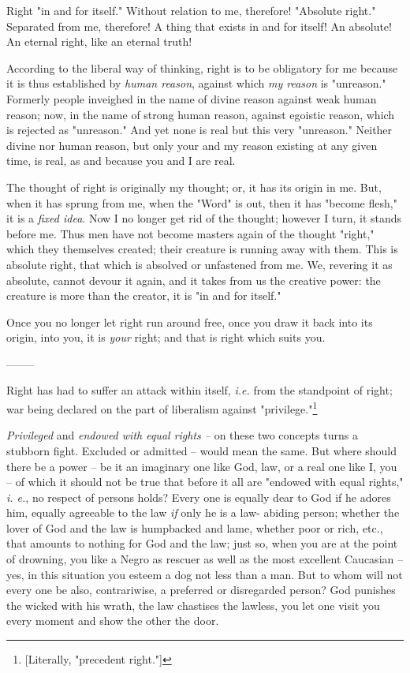 Right "{}in and for itself."{} Without relation to me, therefore! "{}Absolute 
right."{} Separated from me, therefore! A thing that exists in and for itself! 
An absolute! An eternal right, like an eternal truth!

According to the liberal way of thinking, right is to be obligatory for me 
because it is thus established by \textit{human reason}, against which 
\textit{my reason} is "{}unreason."{} Formerly people inveighed in the name of 
divine reason against weak human reason; now, in the name of strong human 
reason, against egoistic reason, which is rejected as "{}unreason."{} And yet 
none is real but this very "{}unreason."{} Neither divine nor human reason, 
but only your and my reason existing at any given time, is real, as and 
because you and I are real.

The thought of right is originally my thought; or, it has its origin in me. 
But, when it has sprung from me, when the "{}Word"{} is out, then it has 
"{}become flesh,"{} it is a \textit{fixed idea}. Now I no longer get rid of 
the thought; however I turn, it stands before me. Thus men have not become 
masters again of the thought "{}right,"{} which they themselves created; their 
creature is running away with them. This is absolute right, that which is 
absolved or unfastened from me. We, revering it as absolute, cannot devour it 
again, and it takes from us the creative power: the creature is more than the 
creator, it is "{}in and for itself."{}

Once you no longer let right run around free, once you draw it back into its 
origin, into you, it is \textit{your} right; and that is right which suits 
you.

\begin{center}
--------\end{center}


Right has had to suffer an attack within itself, \textit{i.e.} from the 
standpoint of right; war being declared on the part of liberalism against 
"{}privilege."{}\footnote{[Literally, "{}precedent right."{}]}

\textit{Privileged} and \textit{endowed with equal rights --} on these two 
concepts turns a stubborn fight. Excluded or admitted -- would mean the same. 
But where should there be a power -- be it an imaginary one like God, law, or 
a real one like I, you -- of which it should not be true that before it all 
are "{}endowed with equal rights,"{} \textit{i. e.}, no respect of persons 
holds? Every one is equally dear to God if he adores him, equally agreeable to 
the law \textit{if} only he is a law- abiding person; whether the lover of God 
and the law is humpbacked and lame, whether poor or rich, etc., that amounts 
to nothing for God and the law; just so, when you are at the point of 
drowning, you like a Negro as rescuer as well as the most excellent Caucasian 
-- yes, in this situation you esteem a dog not less than a man. But to whom 
will not every one be also, contrariwise, a preferred or disregarded person? 
God punishes the wicked with his wrath, the law chastises the lawless, you let 
one visit you every moment and show the other the door.

